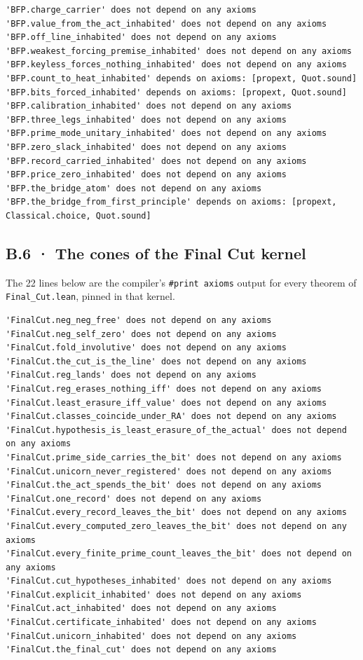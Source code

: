 \documentclass[10pt,twocolumn]{article}
\begin{document}
\begin{Verbatim}
'BFP.charge_carrier' does not depend on any axioms
'BFP.value_from_the_act_inhabited' does not depend on any axioms
'BFP.off_line_inhabited' does not depend on any axioms
'BFP.weakest_forcing_premise_inhabited' does not depend on any axioms
'BFP.keyless_forces_nothing_inhabited' does not depend on any axioms
'BFP.count_to_heat_inhabited' depends on axioms: [propext, Quot.sound]
'BFP.bits_forced_inhabited' depends on axioms: [propext, Quot.sound]
'BFP.calibration_inhabited' does not depend on any axioms
'BFP.three_legs_inhabited' does not depend on any axioms
'BFP.prime_mode_unitary_inhabited' does not depend on any axioms
'BFP.zero_slack_inhabited' does not depend on any axioms
'BFP.record_carried_inhabited' does not depend on any axioms
'BFP.price_zero_inhabited' does not depend on any axioms
'BFP.the_bridge_atom' does not depend on any axioms
'BFP.the_bridge_from_first_principle' depends on axioms: [propext, Classical.choice, Quot.sound]
\end{Verbatim}

\hypertarget{b.6-the-cones-of-the-final-cut-kernel}{%
\subsection{B.6 · The cones of the Final Cut
kernel}\label{b.6-the-cones-of-the-final-cut-kernel}}

The 22 lines below are the compiler's \texttt{\#print\ axioms} output
for every theorem of \texttt{Final\_\allowbreak{}Cut.lean}, pinned in that kernel.

\begin{Verbatim}
'FinalCut.neg_neg_free' does not depend on any axioms
'FinalCut.neg_self_zero' does not depend on any axioms
'FinalCut.fold_involutive' does not depend on any axioms
'FinalCut.the_cut_is_the_line' does not depend on any axioms
'FinalCut.reg_lands' does not depend on any axioms
'FinalCut.reg_erases_nothing_iff' does not depend on any axioms
'FinalCut.least_erasure_iff_value' does not depend on any axioms
'FinalCut.classes_coincide_under_RA' does not depend on any axioms
'FinalCut.hypothesis_is_least_erasure_of_the_actual' does not depend on any axioms
'FinalCut.prime_side_carries_the_bit' does not depend on any axioms
'FinalCut.unicorn_never_registered' does not depend on any axioms
'FinalCut.the_act_spends_the_bit' does not depend on any axioms
'FinalCut.one_record' does not depend on any axioms
'FinalCut.every_record_leaves_the_bit' does not depend on any axioms
'FinalCut.every_computed_zero_leaves_the_bit' does not depend on any axioms
'FinalCut.every_finite_prime_count_leaves_the_bit' does not depend on any axioms
'FinalCut.cut_hypotheses_inhabited' does not depend on any axioms
'FinalCut.explicit_inhabited' does not depend on any axioms
'FinalCut.act_inhabited' does not depend on any axioms
'FinalCut.certificate_inhabited' does not depend on any axioms
'FinalCut.unicorn_inhabited' does not depend on any axioms
'FinalCut.the_final_cut' does not depend on any axioms
\end{Verbatim}
\end{document}
